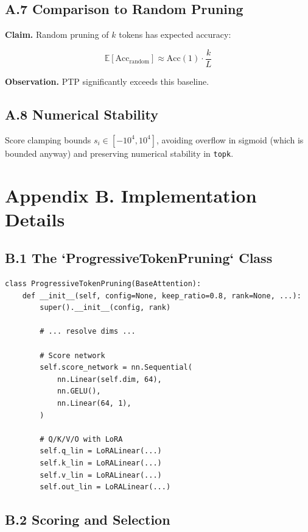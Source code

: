 \subsection{A.7 Comparison to Random Pruning}

\textbf{Claim.} Random pruning of $k$ tokens has expected accuracy:

\[
\mathbb{E}[\text{Acc}_\text{random}] \approx \text{Acc}(1) \cdot \frac{k}{L}
\tag{A.5}
\]

\textbf{Observation.} PTP significantly exceeds this baseline.

\subsection{A.8 Numerical Stability}

Score clamping bounds $s_i \in [-10^4, 10^4]$, avoiding overflow in 
sigmoid (which is bounded anyway) and preserving numerical stability 
in \texttt{topk}.




\section{Appendix B. Implementation Details}

\subsection{B.1 The `ProgressiveTokenPruning` Class}

\begin{lstlisting}
class ProgressiveTokenPruning(BaseAttention):
    def __init__(self, config=None, keep_ratio=0.8, rank=None, ...):
        super().__init__(config, rank)
        
        # ... resolve dims ...
        
        # Score network
        self.score_network = nn.Sequential(
            nn.Linear(self.dim, 64),
            nn.GELU(),
            nn.Linear(64, 1),
        )
        
        # Q/K/V/O with LoRA
        self.q_lin = LoRALinear(...)
        self.k_lin = LoRALinear(...)
        self.v_lin = LoRALinear(...)
        self.out_lin = LoRALinear(...)
\end{lstlisting}

\subsection{B.2 Scoring and Selection}

